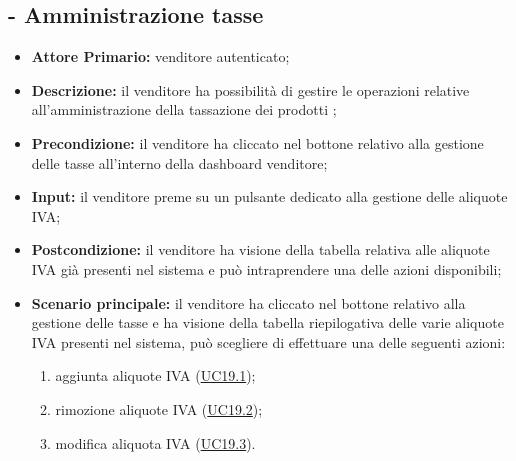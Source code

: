 \subsection{ - Amministrazione tasse}
\begin{itemize}
    \item \textbf{Attore Primario:} venditore autenticato;
    \item \textbf{Descrizione:} il venditore ha possibilità di gestire le operazioni relative all’amministrazione della tassazione dei prodotti ;
    \item \textbf{Precondizione:} il venditore ha cliccato nel bottone relativo alla gestione delle tasse all’interno della dashboard venditore;
    \item \textbf{Input:} il venditore preme su un pulsante dedicato alla gestione delle aliquote IVA;
    \item \textbf{Postcondizione:} il venditore ha visione della tabella relativa alle aliquote IVA già presenti nel sistema e può intraprendere una delle azioni disponibili;
    \item \textbf{Scenario principale:} il venditore ha cliccato nel bottone relativo alla gestione delle tasse e ha visione della tabella riepilogativa delle varie aliquote IVA presenti nel sistema, può scegliere di effettuare una delle seguenti azioni:
          \begin{enumerate}
              \item aggiunta aliquote IVA (\hyperref[UC19.1]{UC19.1});
              \item rimozione aliquote IVA (\hyperref[UC19.2]{UC19.2});
              \item modifica aliquota IVA (\hyperref[UC19.3]{UC19.3}).
          \end{enumerate}
\end{itemize}

\stepsubUserCase
